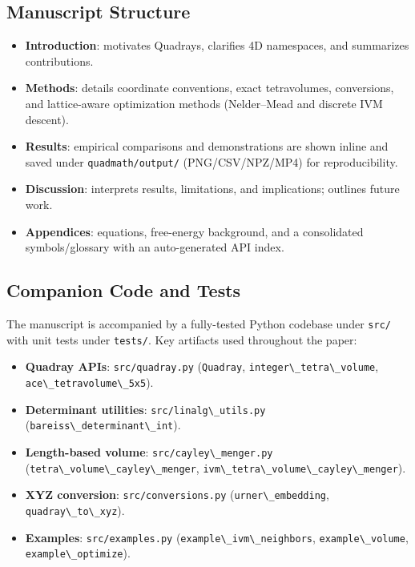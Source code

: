 \documentclass[
  10pt,
]{article}
\newcommand{\passthrough}[1]{#1}
\providecommand{\tightlist}{%
  \setlength{\itemsep}{0pt}\setlength{\parskip}{0pt}}
\begin{document}
\hypertarget{manuscript-structure}{%
\subsection{Manuscript Structure}\label{manuscript-structure}}

\begin{itemize}
\tightlist
\item
  \textbf{Introduction}: motivates Quadrays, clarifies 4D namespaces,
  and summarizes contributions.
\item
  \textbf{Methods}: details coordinate conventions, exact tetravolumes,
  conversions, and lattice-aware optimization methods (Nelder--Mead and
  discrete IVM descent).
\item
  \textbf{Results}: empirical comparisons and demonstrations are shown
  inline and saved under \passthrough{\lstinline!quadmath/output/!}
  (PNG/CSV/NPZ/MP4) for reproducibility.
\item
  \textbf{Discussion}: interprets results, limitations, and
  implications; outlines future work.
\item
  \textbf{Appendices}: equations, free-energy background, and a
  consolidated symbols/glossary with an auto-generated API index.
\end{itemize}

\hypertarget{companion-code-and-tests}{%
\subsection{Companion Code and Tests}\label{companion-code-and-tests}}

The manuscript is accompanied by a fully-tested Python codebase under
\passthrough{\lstinline!src/!} with unit tests under
\passthrough{\lstinline!tests/!}. Key artifacts used throughout the
paper:

\begin{itemize}
\tightlist
\item
  \textbf{Quadray APIs}: \passthrough{\lstinline!src/quadray.py!}
  (\passthrough{\lstinline!Quadray!},
  \passthrough{\lstinline!integer\_tetra\_volume!},
  \passthrough{\lstinline!ace\_tetravolume\_5x5!}).
\item
  \textbf{Determinant utilities}:
  \passthrough{\lstinline!src/linalg\_utils.py!}
  (\passthrough{\lstinline!bareiss\_determinant\_int!}).
\item
  \textbf{Length-based volume}:
  \passthrough{\lstinline!src/cayley\_menger.py!}
  (\passthrough{\lstinline!tetra\_volume\_cayley\_menger!},
  \passthrough{\lstinline!ivm\_tetra\_volume\_cayley\_menger!}).
\item
  \textbf{XYZ conversion}: \passthrough{\lstinline!src/conversions.py!}
  (\passthrough{\lstinline!urner\_embedding!},
  \passthrough{\lstinline!quadray\_to\_xyz!}).
\item
  \textbf{Examples}: \passthrough{\lstinline!src/examples.py!}
  (\passthrough{\lstinline!example\_ivm\_neighbors!},
  \passthrough{\lstinline!example\_volume!},
  \passthrough{\lstinline!example\_optimize!}).
\end{itemize}
\end{document}
